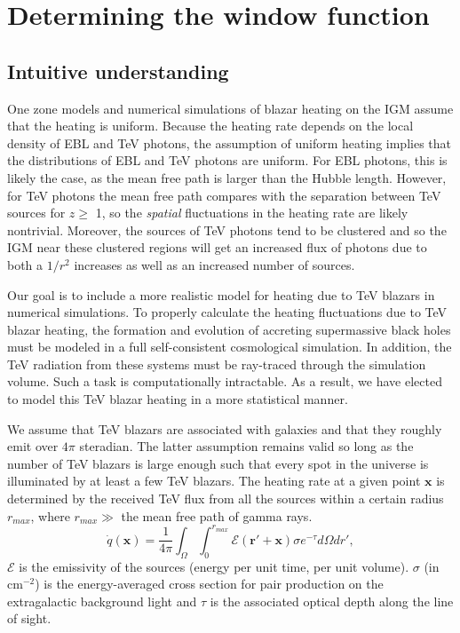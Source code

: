 \documentclass[twocolumns]{emulateapj}
\begin{document}
\section {Determining the window function}\label{window}
\subsection{Intuitive understanding}
One zone models \citep{2012ApJ...752...23C,2012ApJ...752...24P} and numerical simulations  \citep{2012MNRAS.423..149P} of blazar heating on the IGM assume that the heating is uniform.  Because the heating rate depends on the local density of EBL and TeV photons, the assumption of uniform heating implies that the distributions of EBL and TeV photons are uniform.  For EBL photons, this is likely the case, as the mean free path is larger than the Hubble length. However, for TeV photons the mean free path compares with the separation between TeV sources for $z\geqslant$ 1, so the {\it spatial} fluctuations in the heating rate are likely nontrivial. Moreover, the sources of TeV photons tend to be clustered and so the IGM near these clustered regions will get an increased flux of photons due to both a $1/r^2$ increases as well as an increased number of sources.



Our goal is to include a more realistic model for heating due to TeV blazars in numerical simulations.
To properly calculate the heating fluctuations due to TeV blazar heating, the formation and evolution of accreting supermassive black holes must be modeled in a full self-consistent cosmological simulation.  In addition, the TeV radiation from these systems must be ray-traced through the simulation volume.  Such a task is computationally intractable.  As a result, we have elected to model this TeV blazar heating in a more statistical manner.  

We assume that TeV blazars are associated with galaxies and that they roughly emit over $4\pi$ steradian.  The latter assumption remains valid so long as the number of TeV blazars is large enough such that every spot in the universe is illuminated by at least a few TeV blazars. 
The heating rate at a given point $\mathbf{x}$ is determined by the received TeV flux from all the sources within a certain radius $r_{max}$, where $r_{max} \gg $ the mean free path of gamma rays.
\begin{equation}
\label{eq:heating_rate}
  \dot{q}(\mathbf{x})= \frac{1}{4\pi}  \int_{\Omega}\int_0^{r_{max}}   \mathcal{E}(\mathbf{r}'+\mathbf{x})\sigma  e^{-\tau}d\Omega dr' ,
\end{equation}
$\mathcal{E}$ is the emissivity of the sources (energy per unit time, per unit volume). $\sigma$ (in cm$^{-2}$) is the energy-averaged cross section for pair production on the extragalactic background light and $\tau$ is the associated optical depth along the line of sight. 
\end{document}
